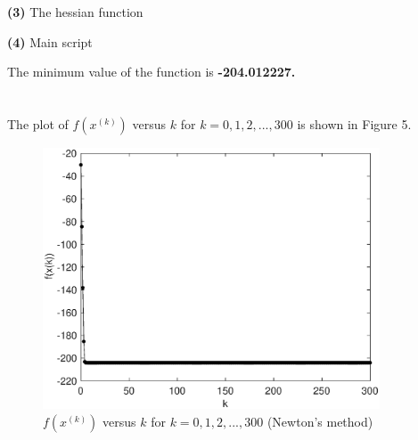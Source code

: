 \documentclass[12pt]{article}
\begin{document}


\bigskip\noindent\textbf{(3)}  The hessian function



\bigskip\noindent\textbf{(4)}  Main script



\bigskip\noindent The minimum value of the function is \textbf{-204.012227.}\\\\\\

\noindent The plot of $f(x^{(k)})$ versus $k$ for $k=0,1,2,...,300$ is shown in Figure 5.

\begin{figure}[!htbp]
	\centering
	\includegraphics[width=10cm]{figures/fig5.eps}      
	\caption{$f(x^{(k)})$ versus $k$ for $k=0,1,2,...,300$ (Newton's method)}
\end{figure}
\end{document}
